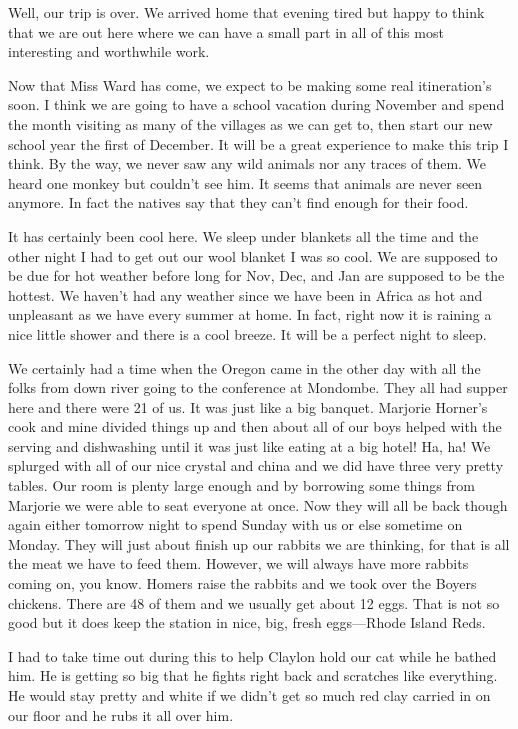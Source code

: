 \documentclass[
]{book}
\begin{document}
Well, our trip is over. We arrived home that evening tired but happy to think that we are out here where we can have a small part in all of this most interesting and worthwhile work.

Now that Miss Ward has come, we expect to be making some real itineration's soon. I think we are going to have a school vacation during November and spend the month visiting as many of the villages as we can get to, then start our new school year the first of December. It will be a great experience to make this trip I think. By the way, we never saw any wild animals nor any traces of them. We heard one monkey but couldn't see him. It seems that animals are never seen anymore. In fact the natives say that they can't find enough for their food.

It has certainly been cool here. We sleep under blankets all the time and the other night I had to get out our wool blanket I was so cool. We are supposed to be due for hot weather before long for Nov, Dec, and Jan are supposed to be the hottest. We haven't had any weather since we have been in Africa as hot and unpleasant as we have every summer at home. In fact, right now it is raining a nice little shower and there is a cool breeze. It will be a perfect night to sleep.

We certainly had a time when the Oregon came in the other day with all the folks from down river going to the conference at Mondombe. They all had supper here and there were 21 of us. It was just like a big banquet. Marjorie Horner's cook and mine divided things up and then about all of our boys helped with the serving and dishwashing until it was just like eating at a big hotel! Ha, ha! We splurged with all of our nice crystal and china and we did have three very pretty tables. Our room is plenty large enough and by borrowing some things from Marjorie we were able to seat everyone at once. Now they will all be back though again either tomorrow night to spend Sunday with us or else sometime on Monday. They will just about finish up our rabbits we are thinking, for that is all the meat we have to feed them. However, we will always have more rabbits coming on, you know. Homers raise the rabbits and we took over the Boyers chickens. There are 48 of them and we usually get about 12 eggs. That is not so good but it does keep the station in nice, big, fresh eggs---Rhode Island Reds.

I had to take time out during this to help Claylon hold our cat while he bathed him. He is getting so big that he fights right back and scratches like everything. He would stay pretty and white if we didn't get so much red clay carried in on our floor and he rubs it all over him.
\end{document}

